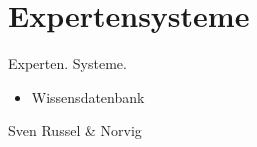 \chapter{Expertensysteme}
\label{chap:experten_systeme}

Experten. Systeme.
\begin{itemize}
\item Wissensdatenbank
\end{itemize}


Sven
Russel \& Norvig

